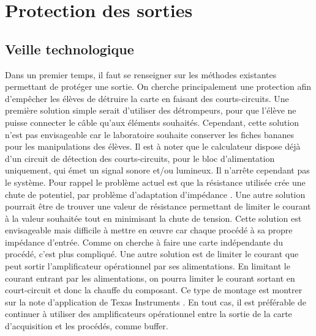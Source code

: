 \documentclass{report}
\begin{document}
\section{Protection des sorties}
\subsection{Veille technologique}
Dans un premier temps, il faut se renseigner sur les méthodes existantes permettant de protéger une sortie. On cherche principalement une protection afin d'empêcher les élèves de détruire la carte en faisant des courts-circuits. Une première solution simple serait d'utiliser des détrompeurs, pour que l'élève ne puisse connecter le câble qu'aux éléments souhaités. Cependant, cette solution n'est pas envisageable car le laboratoire souhaite conserver les fiches bananes pour les manipulations des élèves.
Il est à noter que le calculateur dispose déjà d'un circuit de détection des courts-circuits, pour le bloc d'alimentation uniquement, qui émet un signal sonore et/ou lumineux. Il n'arrête cependant pas le système. Pour rappel le problème actuel est que la résistance utilisée crée une chute de potentiel, par problème d'adaptation d'impédance \cite{Gabriel2012}. Une autre solution pourrait être de trouver une valeur de résistance permettant de limiter le courant à la valeur souhaitée tout en minimisant la chute de tension. Cette solution est envisageable mais difficile à mettre en œuvre car chaque procédé à sa propre impédance d'entrée. Comme on cherche à faire une carte indépendante du procédé, c'est plus compliqué.
Une autre solution est de limiter le courant que peut sortir l'amplificateur opérationnel par ses alimentations. En limitant le courant entrant par les alimentations, on pourra limiter le courant sortant en court-circuit et donc la chauffe du composant. Ce type de montage est montrer sur la note d'application de Texas Instruments \cite{appnoteti}.
En tout cas, il est préférable de continuer à utiliser des amplificateurs opérationnel entre la sortie de la carte d'acquisition et les procédés, comme buffer.
\end{document}

